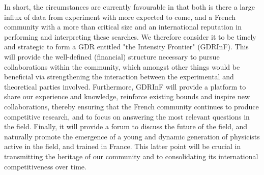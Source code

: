 In short, the circumstances are currently favourable in that both is there a large influx of data from experiment with more expected to come, and a French community with a more than critical size and an international reputation in performing and interpreting these searches. We therefore consider it to be timely and strategic to form a GDR entitled "the Intensity Frontier" (GDRInF). This  will provide the well-defined (financial) structure necessary to pursue collaborations within the community, which amongst other things would be beneficial via strengthening the interaction between the experimental and theoretical parties involved. Furthermore, GDRInF will provide a platform to share our experience and knowledge, reinforce existing bounds and inspire new collaborations, thereby ensuring that the French community continues to produce competitive research, and to focus on answering the most relevant questions in the field. Finally, it will provide a forum to discuss the future of the field, and naturally promote the emergence of a young and dynamic generation of physicists active in the field, and trained in France. This latter point will be crucial in transmitting the heritage of our community and to consolidating its international competitiveness over time.
